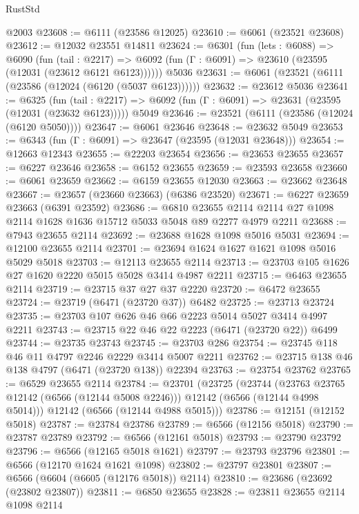 \begin{lexlean}{RustStd}
\begin{coremodule}
{\begin{coremodule}
{{{{{{{{{{{{{{{{{{{{{{{{{{    @2003
@23608 := @6111 (@23586 @12025)
@23610 := @6061 (@23521 @23608)
@23612 := @12032 @23551 @14811
@23624 := @6301
    (fun (lets : @6088) =>
    @6090
      (fun (tail : @2217) =>
      @6092 (fun (Γ : @6091) => @23610 (@23595 (@12031 (@23612 @6121 @6123))))))
    @5036
@23631 := @6061 (@23521 (@6111 (@23586 (@12024 (@6120 (@5037 @6123))))))
@23632 := @23612 @5036
@23641 := @6325
    (fun (tail : @2217) => @6092 (fun (Γ : @6091) => @23631 (@23595 (@12031 (@23632 @6123)))))
    @5049
@23646 := @23521 (@6111 (@23586 (@12024 (@6120 @5050))))
@23647 := @6061 @23646
@23648 := @23632 @5049
@23653 := @6343 (fun (Γ : @6091) => @23647 (@23595 (@12031 @23648)))
@23654 := @12663 @12343
@23655 := @22203 @23654
@23656 := @23653 @23655
@23657 := @6227 @23646
@23658 := @6152 @23655
@23659 := @23593 @23658
@23660 := @6061 @23659
@23662 := @6159 @23655 @12030
@23663 := @23662 @23648
@23667 := @23657 (@23660 @23663) (@6386 @23520)
@23671 := @6227 @23659 @23663 (@6391 @23592)
@23686 := @6810
    @23655
    @2114
    @2114
    @27
    @1098
    @2114
    @1628
    @1636
    @15712
    @5033
    @5048
    @89
    @2277
    @4979
    @2211
@23688 := @7943 @23655 @2114
@23692 := @23688 @1628 @1098 @5016 @5031
@23694 := @12100 @23655 @2114
@23701 := @23694 @1624 @1627 @1621 @1098 @5016 @5029 @5018
@23703 := @12113 @23655 @2114
@23713 := @23703 @105 @1626 @27 @1620 @2220 @5015 @5028 @3414 @4987 @2211
@23715 := @6463 @23655 @2114
@23719 := @23715 @37 @27 @37 @2220
@23720 := @6472 @23655
@23724 := @23719 (@6471 (@23720 @37)) @6482
@23725 := @23713 @23724
@23735 := @23703 @107 @626 @46 @66 @2223 @5014 @5027 @3414 @4997 @2211
@23743 := @23715 @22 @46 @22 @2223 (@6471 (@23720 @22)) @6499
@23744 := @23735 @23743
@23745 := @23703 @286
@23754 := @23745 @118 @46 @11 @4797 @2246 @2229 @3414 @5007 @2211
@23762 := @23715 @138 @46 @138 @4797 (@6471 (@23720 @138)) @22394
@23763 := @23754 @23762
@23765 := @6529 @23655 @2114
@23784 := @23701
    (@23725
      (@23744
        (@23763 @23765 @12142 (@6566 (@12144 @5008 @2246)))
        @12142
        (@6566 (@12144 @4998 @5014)))
      @12142
      (@6566 (@12144 @4988 @5015)))
@23786 := @12151 (@12152 @5018)
@23787 := @23784 @23786
@23789 := @6566 (@12156 @5018)
@23790 := @23787 @23789
@23792 := @6566 (@12161 @5018)
@23793 := @23790 @23792
@23796 := @6566 (@12165 @5018 @1621)
@23797 := @23793 @23796
@23801 := @6566 (@12170 @1624 @1621 @1098)
@23802 := @23797 @23801
@23807 := @6566 (@6604 (@6605 (@12176 @5018)) @2114)
@23810 := @23686 (@23692 (@23802 @23807))
@23811 := @6850 @23655
@23828 := @23811
    @23655
    @2114
    @1098
    @2114
}}}}}}}}}}}}}}}}}}}}}}}}}}
\end{coremodule}}
\end{coremodule}
\end{lexlean}
